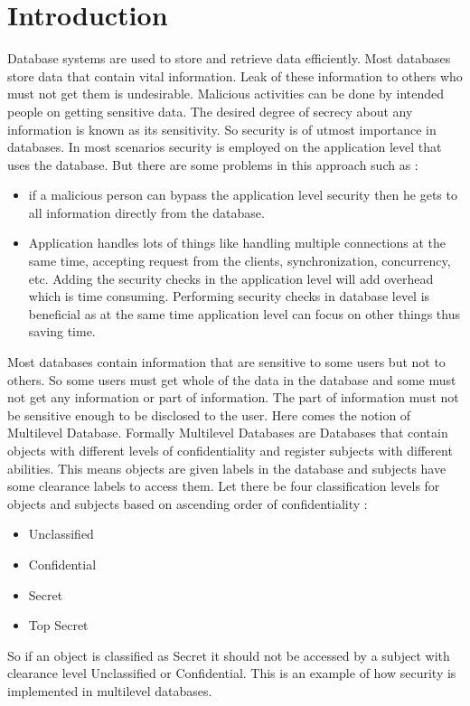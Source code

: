 \documentclass[11pt,a4paper]{report}
\begin{document}
 \chapter{Introduction}
Database systems are used to store and retrieve data efficiently. Most databases store data that contain vital information. Leak of these information to others who must not get them is undesirable. Malicious activities can be done by intended people on getting sensitive data. 
The desired degree of secrecy about any information is known as its sensitivity. So security is of utmost importance in databases. In most scenarios security is employed on the application level that uses the database. But there are some problems in this approach such as :
\begin{itemize}
	\item if a malicious person can bypass the application level security then he gets to all information directly from the database. 
	\item Application handles lots of things like handling multiple connections at the same time, accepting request from the clients, synchronization, concurrency, etc. Adding the security checks in the application level will add overhead which is time consuming. Performing security checks in database level is beneficial as at the same time application level can focus on other things thus saving time. \\
\end{itemize}
Most databases contain information that are sensitive to some users but not to others. So some users must get whole of the data in the database and some must not get any information or part of information. The part of information must not be sensitive enough to be disclosed to the user.  Here comes the notion of Multilevel Database. Formally Multilevel Databases are Databases that contain objects with different levels of confidentiality and register subjects with different abilities. This means objects are given labels in the database and subjects have some clearance labels to access them. Let there be four classification levels for objects and subjects based on ascending order of confidentiality :
\begin{itemize}
\item Unclassified 
\item Confidential
\item Secret
\item Top Secret
\end{itemize}
  
So if an object is classified as Secret it should not be accessed by a subject with clearance level Unclassified or Confidential. This is an example of how security is implemented in multilevel databases. 
\end{document}
